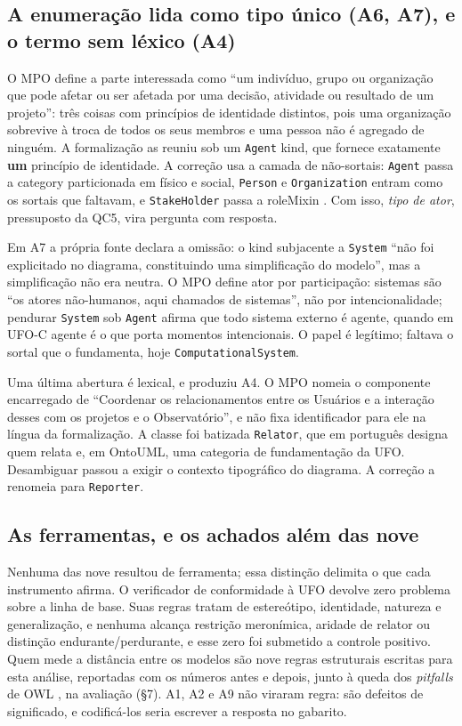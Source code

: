 \subsection{A enumeração lida como tipo único (A6, A7), e o termo sem léxico (A4)}

O MPO define a parte interessada como ``um indivíduo, grupo ou organização que pode afetar ou ser afetada por uma decisão, atividade ou resultado de um projeto'': três coisas com princípios de identidade distintos, pois uma organização sobrevive à troca de todos os seus membros e uma pessoa não é agregado de ninguém. A formalização as reuniu sob um \texttt{Agent} \guillemotleft{}kind\guillemotright{}, que fornece exatamente \textbf{um} princípio de identidade. A correção usa a camada de não-sortais: \texttt{Agent} passa a \guillemotleft{}category\guillemotright{} particionada em físico e social, \texttt{Person} e \texttt{Organization} entram como os sortais que faltavam, e \texttt{StakeHolder} passa a \guillemotleft{}roleMixin\guillemotright{} \cite{guizzardi2008grounding}. Com isso, \textit{tipo de ator}, pressuposto da QC5, vira pergunta com resposta.

Em A7 a própria fonte declara a omissão: o kind subjacente a \texttt{System} ``não foi explicitado no diagrama, constituindo uma simplificação do modelo'', mas a simplificação não era neutra. O MPO define ator por participação: sistemas são ``os atores não-humanos, aqui chamados de sistemas'', não por intencionalidade; pendurar \texttt{System} sob \texttt{Agent} afirma que todo sistema externo é agente, quando em UFO-C agente é o que porta momentos intencionais. O papel é legítimo; faltava o sortal que o fundamenta, hoje \texttt{ComputationalSystem}.

Uma última abertura é lexical, e produziu A4. O MPO nomeia o componente encarregado de ``Coordenar os relacionamentos entre os Usuários e a interação desses com os projetos e o Observatório'', e não fixa identificador para ele na língua da formalização. A classe foi batizada \texttt{Relator}, que em português designa quem relata e, em OntoUML, uma categoria de fundamentação da UFO. Desambiguar passou a exigir o contexto tipográfico do diagrama. A correção a renomeia para \texttt{Reporter}.

\subsection{As ferramentas, e os achados além das nove}

Nenhuma das nove resultou de ferramenta; essa distinção delimita o que cada instrumento afirma. O verificador de conformidade à UFO devolve zero problema sobre a linha de base. Suas regras tratam de estereótipo, identidade, natureza e generalização, e nenhuma alcança restrição meronímica, aridade de relator ou distinção endurante/perdurante, e esse zero foi submetido a controle positivo. Quem mede a distância entre os modelos são nove regras estruturais escritas para esta análise, reportadas com os números antes e depois, junto à queda dos \textit{pitfalls} de OWL \cite{poveda2014oops}, na avaliação (\S{}7). A1, A2 e A9 não viraram regra: são defeitos de significado, e codificá-los seria escrever a resposta no gabarito.

